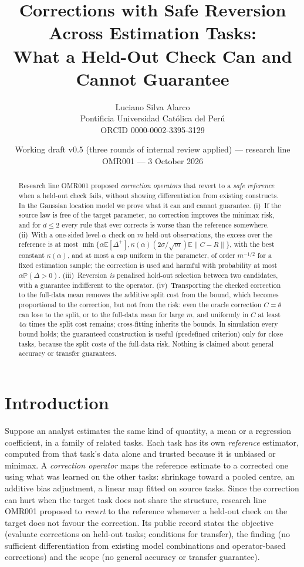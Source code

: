 \documentclass[10pt,a4paper]{article}
\title{\textbf{Corrections with Safe Reversion Across Estimation Tasks:}\\[2pt]
\large What a Held-Out Check Can and Cannot Guarantee}
\author{Luciano Silva Alarco\\
\small Pontificia Universidad Cat\'olica del Per\'u\\
\small ORCID 0000-0002-3395-3129}
\date{\small Working draft v0.5 (three rounds of internal review applied) --- research line OMR001 --- 3 October 2026}
\theoremstyle{plain}
\theoremstyle{definition}
\theoremstyle{remark}
\newcommand{\E}{\mathbb{E}}
\newcommand{\Prob}{\mathbb{P}}
\newcommand{\norm}[1]{\lVert #1\rVert}
\begin{document}
\maketitle

\begin{abstract}
\noindent
Research line OMR001 proposed \emph{correction operators} that revert to a \emph{safe reference} when a held-out check fails, without showing differentiation from existing constructs. In the Gaussian location model we prove what it can and cannot guarantee. (i)~If the source law is free of the target parameter, no correction improves the minimax risk, and for $d\le2$ every rule that ever corrects is worse than the reference somewhere. (ii)~With a one-sided level-$\alpha$ check on $m$ held-out observations, the excess over the reference is at most $\min\{\alpha\E[\Delta^+],\kappa(\alpha)(2\sigma/\sqrt m)\E\norm{C-R}\}$, with the best constant $\kappa(\alpha)$, and at most a cap uniform in the parameter, of order $m^{-1/2}$ for a fixed estimation sample; the correction is used and harmful with probability at most $\alpha\Prob(\Delta>0)$. (iii)~Reversion \emph{is} penalised hold-out selection between two candidates, with a guarantee indifferent to the operator. (iv)~Transporting the checked correction to the full-data mean removes the additive split cost from the bound, which becomes proportional to the correction, but not from the risk: even the oracle correction $C=\theta$ can lose to the split, or to the full-data mean for large $m$, and uniformly in $C$ at least $4\alpha$ times the split cost remains; cross-fitting inherits the bounds. In simulation every bound holds; the guaranteed construction is useful (predefined criterion) only for close tasks, because the split costs \SplitCost{} of the full-data risk. Nothing is claimed about general accuracy or transfer guarantees.
\end{abstract}

\section{Introduction}\label{sec:intro}

Suppose an analyst estimates the same kind of quantity, a mean or a regression coefficient, in a family of related tasks. Each task has its own \emph{reference} estimator, computed from that task's data alone and trusted because it is unbiased or minimax. A \emph{correction operator} maps the reference estimate to a corrected one using what was learned on the other tasks: shrinkage toward a pooled centre, an additive bias adjustment, a linear map fitted on source tasks. Since the correction can hurt when the target task does not share the structure, research line OMR001 proposed to \emph{revert} to the reference whenever a held-out check on the target does not favour the correction. Its public record states the objective (evaluate corrections on held-out tasks; conditions for transfer), the finding (no sufficient differentiation from existing model combinations and operator-based corrections) and the scope (no general accuracy or transfer guarantee).
\end{document}
